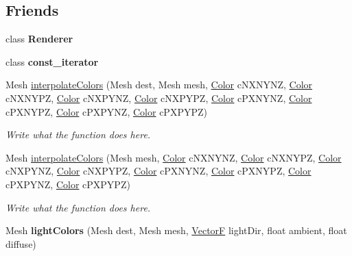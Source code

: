 \subsection*{Friends}
\begin{DoxyCompactItemize}
\item 
\hypertarget{classMesh__t_a70538530bc36e033e360880ef311df61}{class {\bfseries Renderer}}\label{classMesh__t_a70538530bc36e033e360880ef311df61}

\item 
\hypertarget{classMesh__t_ac220ce1c155db1ac44146c12d178056f}{class {\bfseries const\+\_\+iterator}}\label{classMesh__t_ac220ce1c155db1ac44146c12d178056f}

\item 
Mesh \hyperlink{classMesh__t_a0ab16f7503fdb1f905d12ced2ee33b86}{interpolate\+Colors} (Mesh dest, Mesh mesh, \hyperlink{structColor}{Color} c\+N\+X\+N\+Y\+N\+Z, \hyperlink{structColor}{Color} c\+N\+X\+N\+Y\+P\+Z, \hyperlink{structColor}{Color} c\+N\+X\+P\+Y\+N\+Z, \hyperlink{structColor}{Color} c\+N\+X\+P\+Y\+P\+Z, \hyperlink{structColor}{Color} c\+P\+X\+N\+Y\+N\+Z, \hyperlink{structColor}{Color} c\+P\+X\+N\+Y\+P\+Z, \hyperlink{structColor}{Color} c\+P\+X\+P\+Y\+N\+Z, \hyperlink{structColor}{Color} c\+P\+X\+P\+Y\+P\+Z)
\begin{DoxyCompactList}\small\item\em Write what the function does here. \end{DoxyCompactList}\item 
Mesh \hyperlink{classMesh__t_a5851e8a3dfa659914a6ee77e081bd5c6}{interpolate\+Colors} (Mesh mesh, \hyperlink{structColor}{Color} c\+N\+X\+N\+Y\+N\+Z, \hyperlink{structColor}{Color} c\+N\+X\+N\+Y\+P\+Z, \hyperlink{structColor}{Color} c\+N\+X\+P\+Y\+N\+Z, \hyperlink{structColor}{Color} c\+N\+X\+P\+Y\+P\+Z, \hyperlink{structColor}{Color} c\+P\+X\+N\+Y\+N\+Z, \hyperlink{structColor}{Color} c\+P\+X\+N\+Y\+P\+Z, \hyperlink{structColor}{Color} c\+P\+X\+P\+Y\+N\+Z, \hyperlink{structColor}{Color} c\+P\+X\+P\+Y\+P\+Z)
\begin{DoxyCompactList}\small\item\em Write what the function does here. \end{DoxyCompactList}\item 
\hypertarget{classMesh__t_a9ce03347d000c1329597409cb46e32c5}{Mesh {\bfseries light\+Colors} (Mesh dest, Mesh mesh, \hyperlink{structVectorF}{Vector\+F} light\+Dir, float ambient, float diffuse)}\label{classMesh__t_a9ce03347d000c1329597409cb46e32c5}

\end{DoxyCompactItemize}


